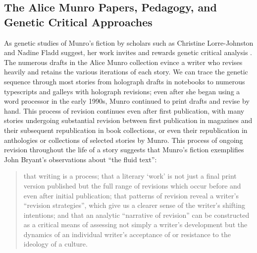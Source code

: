 \begin{paper}
\subsection*{The Alice Munro Papers, Pedagogy, and Genetic Critical
Approaches}

As genetic studies of Munro's fiction by scholars such as Christine
Lorre-Johnston and Nadine Fladd suggest, her work invites and rewards
genetic critical analysis \citep{lorre-johnston_pictures_2015,fladd_alice_2015}. The numerous drafts in the Alice Munro
collection evince a writer who revises heavily and retains the various
iterations of each story. We can trace the genetic sequence through most
stories from holograph drafts in notebooks to numerous typescripts and
galleys with holograph revisions; even after she began using a word
processor in the early 1990s, Munro continued to print drafts and revise
by hand. This process of revision continues even after first
publication, with many stories undergoing substantial revision between
first publication in magazines and their subsequent republication in
book collections, or even their republication in anthologies or
collections of selected stories by Munro. This process of ongoing
revision throughout the life of a story suggests that Munro's fiction
exemplifies John Bryant's observations about ``the fluid text'':

\begin{quote}
that writing is a process; that a literary `work' is not just a final
print version published but the full range of revisions which occur before and even after initial publication; that patterns of revision reveal a writer's ``revision strategies'', which give us a clearer sense of the writer's shifting intentions; and that an
analytic ``narrative of revision'' can be constructed as a critical means of assessing not simply a writer's development but the dynamics of an individual writer's acceptance of or resistance to the ideology of a culture.

\begin{flushright}
    \parencite[4]{bryant_melville_2008}
\end{flushright}
\end{quote}


\end{paper}
